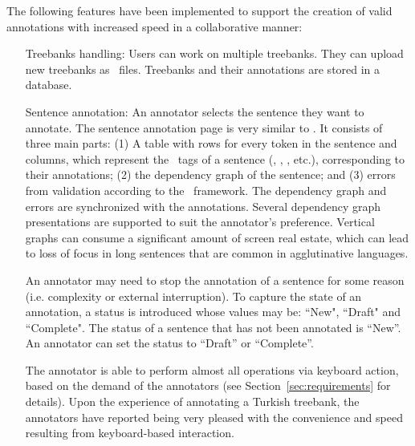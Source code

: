 The following features have been implemented to support the creation of valid annotations with increased speed in a collaborative manner:
\begin{itemize}[before=\normalfont, font=\itshape, align=left,noitemsep,topsep=0pt,parsep=0pt,partopsep=0pt,labelsep=3pt,align=left]
    \item[Treebanks handling:]
        Users can work on multiple treebanks.
        They can upload new treebanks as \conllu\ files.
        Treebanks and their annotations are stored in a database.

    \item[Sentence annotation:]
    	An annotator selects the sentence they want to annotate.
        The sentence annotation page is very similar to \boatvone.
        It consists of three main parts: (1) A table with rows for every token in the sentence and columns, which represent the \ud\ tags of a sentence (\form, \lemma, \deprel, etc.), corresponding to their annotations; (2) the dependency graph of the sentence; and (3) errors from validation according to the \ud\ framework.
        The dependency graph and errors are synchronized with the annotations.
        Several dependency graph presentations are supported to suit the annotator's preference.
        Vertical graphs can consume a significant amount of screen real estate, which can lead to loss of focus in long sentences that are common in agglutinative languages.

        An annotator may need to stop the annotation of a sentence for some reason (i.e. complexity or external interruption).
        To capture the state of an annotation, a status is introduced whose values may be: ``New", ``Draft" and ``Complete".
        The status of a sentence that has not been annotated is ``New''.
	An annotator can set the status to ``Draft'' or ``Complete''.

        The annotator is able to perform almost all operations via keyboard action, based on the demand of the annotators (see Section~\ref{sec:requirements} for details).
        Upon the experience of annotating a Turkish treebank, the annotators have reported being very pleased with the convenience and speed resulting from keyboard-based interaction.


\end{itemize}
